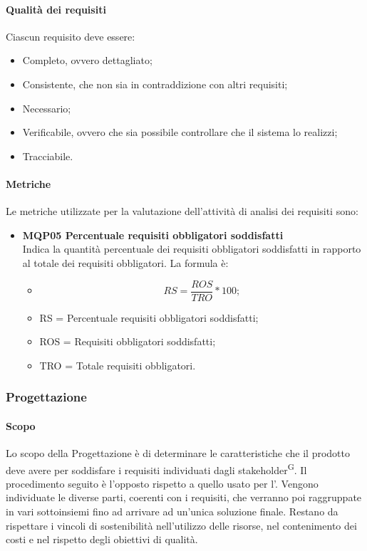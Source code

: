 \paragraph{Qualità dei requisiti}
Ciascun requisito deve essere:
\begin{itemize}
  \item Completo, ovvero dettagliato;
  \item Consistente, che non sia in contraddizione con altri requisiti;
  \item Necessario;
  \item Verificabile, ovvero che sia possibile controllare che il sistema lo realizzi;
  \item Tracciabile.
\end{itemize}

\paragraph{Metriche}
Le metriche utilizzate per la valutazione dell'attività di analisi dei requisiti sono:
\begin{itemize}
\item \textbf{MQP05 Percentuale requisiti obbligatori soddisfatti} \\
Indica la quantità percentuale dei requisiti obbligatori soddisfatti in rapporto al totale dei requisiti obbligatori.
La formula è:
\begin{itemize}
  \item[] \[RS = \frac{ROS}{TRO} * 100;\]
  \item RS = Percentuale requisiti obbligatori soddisfatti;
  \item ROS = Requisiti obbligatori soddisfatti;
  \item TRO = Totale requisiti 	obbligatori.
  \end{itemize}
\end{itemize}


\subsubsection{Progettazione}
\paragraph{Scopo}
Lo scopo della Progettazione è di determinare le caratteristiche che il prodotto deve avere per soddisfare i requisiti individuati dagli stakeholder\textsuperscript{G}. Il procedimento seguito è l'opposto rispetto a quello usato per l'\AdR. Vengono individuate le diverse parti, coerenti con i requisiti, che verranno poi raggruppate in vari sottoinsiemi fino ad arrivare ad un'unica soluzione finale. Restano da rispettare i vincoli di sostenibilità nell'utilizzo delle risorse, nel contenimento dei costi e nel rispetto degli obiettivi di qualità.

